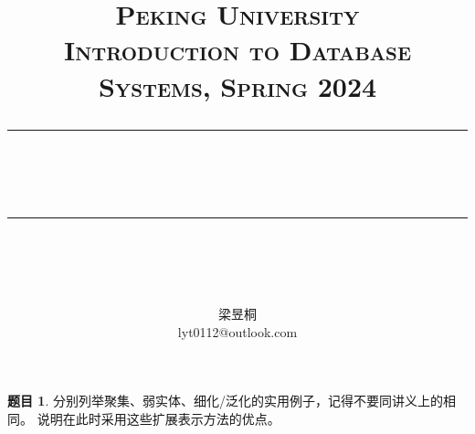 \documentclass[12pt]{article} %
\theoremstyle{definition}
\newtheorem{problem}{题目}
\newcommand{\horrule}[1]{\rule[0.5ex]{\linewidth}{#1}} 	%
\begin{document}
\title{
{\normalfont\normalsize\textsc{
Peking University\\
Introduction to Database Systems, Spring 2024 \\[25pt]}}
\horrule{0.5pt}\\
\horrule{1.8pt}\\[20pt]
}
\author{梁昱桐\\lyt0112@outlook.com}

\begin{titlepage}
\maketitle
\vspace{30pt}


\thispagestyle{empty}
\end{titlepage}


\newpage
\setcounter{page}{1}

\begin{problem}
分别列举聚集、弱实体、细化/泛化的实用例子，记得不要同讲义上的相同。
说明在此时采用这些扩展表示方法的优点。
\end{problem}
\end{document}
